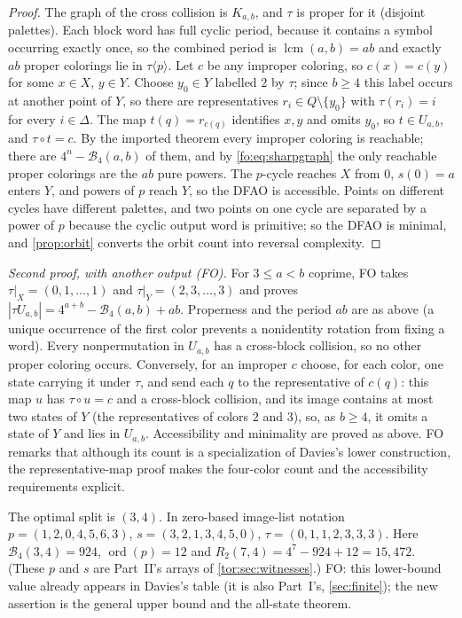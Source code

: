 \documentclass[11pt,a4paper]{article}
\numberwithin{equation}{section}
\theoremstyle{definition}
\theoremstyle{remark}
\newcommand{\D}{\Delta}
\newcommand{\ord}{\operatorname{ord}}
\newcommand{\lcm}{\operatorname{lcm}}
\newcommand{\Bip}{\mathcal B}
\begin{document}
\begin{proof}
The graph of the cross collision is $K_{a,b}$, and $\tau$ is proper for it
(disjoint palettes). Each block word has full cyclic period, because it
contains a symbol occurring exactly once, so the combined period is
$\lcm(a,b)=ab$ and exactly $ab$ proper colorings lie in $\tau\langle p\rangle$.
Let $c$ be any improper coloring, so $c(x)=c(y)$ for some $x\in X$, $y\in Y$.
Choose $y_0\in Y$ labelled $2$ by $\tau$; since $b\ge4$ this label occurs at
another point of $Y$, so there are representatives $r_i\in Q\setminus\{y_0\}$
with $\tau(r_i)=i$ for every $i\in\D$. The map $t(q)=r_{c(q)}$ identifies
$x,y$ and omits $y_0$, so $t\in U_{a,b}$, and $\tau\circ t=c$. By the imported
theorem every improper coloring is reachable; there are $4^n-\Bip_4(a,b)$ of
them, and by \eqref{fo:eq:sharpgraph} the only reachable proper colorings are
the $ab$ pure powers. The $p$-cycle reaches $X$ from $0$, $s(0)=a$ enters $Y$,
and powers of $p$ reach $Y$, so the DFAO is accessible. Points on different
cycles have different palettes, and two points on one cycle are separated by
a power of $p$ because the cyclic output word is primitive; so the DFAO is
minimal, and \cref{prop:orbit} converts the orbit count into reversal
complexity.
\end{proof}

\noindent\emph{Second proof, with another output (FO).} For $3\le a<b$
coprime, FO takes $\tau|_X=(0,1,\ldots,1)$ and $\tau|_Y=(2,3,\ldots,3)$ and
proves $|\tau U_{a,b}|=4^{a+b}-\Bip_4(a,b)+ab$. Properness and the period
$ab$ are as above (a unique occurrence of the first color prevents a
nonidentity rotation from fixing a word). Every nonpermutation in $U_{a,b}$
has a cross-block collision, so no other proper coloring occurs. Conversely,
for an improper $c$ choose, for each color, one state carrying it under
$\tau$, and send each $q$ to the representative of $c(q)$: this map $u$ has
$\tau\circ u=c$ and a cross-block collision, and its image contains at most
two states of $Y$ (the representatives of colors $2$ and $3$), so, as
$b\ge4$, it omits a state of $Y$ and lies in $U_{a,b}$. Accessibility and
minimality are proved as above. FO remarks that although its count is a
specialization of Davies's lower construction, the representative-map proof
makes the four-color count and the accessibility requirements explicit.

\begin{example}\label{fo:fo:ex:n7}
The optimal split is $(3,4)$. In zero-based image-list notation
$p=(1,2,0,4,5,6,3)$, $s=(3,2,1,3,4,5,0)$, $\tau=(0,1,1,2,3,3,3)$. Here
$\Bip_4(3,4)=924$, $\ord(p)=12$ and $R_2(7,4)=4^7-924+12=15{,}472$. (These $p$
and $s$ are Part~II's arrays of \cref{tor:sec:witnesses}.) FO: this lower-bound
value already appears in Davies's table (it is also Part~I's, \cref{sec:finite});
the new assertion is the general upper bound and the all-state theorem.
\end{example}
\end{document}
